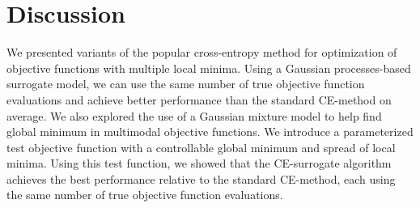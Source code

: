 \section{Discussion} \label{sec:cem_discussion}
We presented variants of the popular cross-entropy method for optimization of objective functions with multiple local minima.
Using a Gaussian processes-based surrogate model, we can use the same number of true objective function evaluations and achieve better performance than the standard CE-method on average.
We also explored the use of a Gaussian mixture model to help find global minimum in multimodal objective functions.
We introduce a parameterized test objective function with a controllable global minimum and spread of local minima.
Using this test function, we showed that the CE-surrogate algorithm achieves the best performance relative to the standard CE-method, each using the same number of true objective function evaluations.


